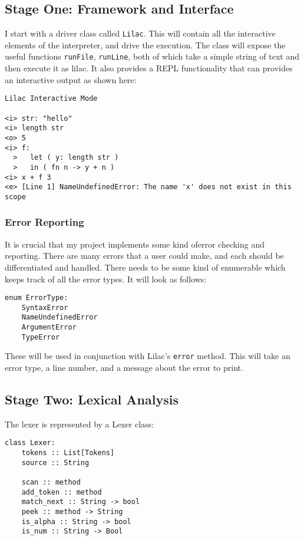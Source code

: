 \documentclass[a4paper, 12pt]{article}
\begin{document}
\subsection{Stage One: Framework and Interface}\label{sec:stage-one-framework-and-interface}
I start with a driver class called \verb|Lilac|. This will contain all the interactive elements of the interpreter, and drive the execution. The class will expose the useful functions \verb|runFile|, \verb|runLine|, both of which take a simple string of text and then execute it as lilac. It also provides a REPL functionality that can provides an interactive output as shown here:\\
\begin{verbatim}
Lilac Interactive Mode

<i> str: "hello"
<i> length str
<o> 5
<i> f:
  >   let ( y: length str )
  >   in ( fn n -> y + n )
<i> x + f 3
<e> [Line 1] NameUndefinedError: The name 'x' does not exist in this scope
\end{verbatim}
\subsubsection{Error Reporting}\label{sec:error-reporting}
It is crucial that my project implements some kind oferror checking and reporting. There are many errors that a user could make, and each should be differentiated and handled. There needs to be some kind of enumerable which keeps track of all the error types. It will look as follows:

\begin{verbatim}
enum ErrorType:
	SyntaxError
	NameUndefinedError
	ArgumentError
	TypeError
\end{verbatim}

These will be used in conjunction with Lilac's \verb|error| method. This will take an error type, a line number, and a message about the error to print. 

\subsection{Stage Two: Lexical Analysis}\label{sec:stage-two-lexical-analysis}
The lexer is represented by a Lexer class:

\begin{verbatim}
class Lexer:
    tokens :: List[Tokens]
    source :: String

    scan :: method
    add_token :: method
    match_next :: String -> bool
    peek :: method -> String
    is_alpha :: String -> bool
    is_num :: String -> Bool
\end{verbatim}
\end{document}
